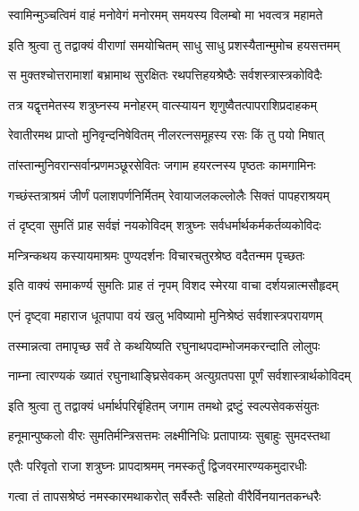 \twolineshloka
{स्वामिन्मुञ्चत्विमं वाहं मनोवेगं मनोरमम्}
{समयस्य विलम्बो मा भवत्वत्र महामते}%


\twolineshloka
{इति श्रुत्वा तु तद्वाक्यं वीराणां समयोचितम्}
{साधु साधु प्रशस्यैतान्मुमोच हयसत्तमम्}%

\twolineshloka
{स मुक्तश्चोत्तरामाशां बभ्रामाथ सुरक्षितः}
{रथपत्तिहयश्रेष्ठैः सर्वशस्त्रास्त्रकोविदैः}%

\twolineshloka
{तत्र यद्वृत्तमेतस्य शत्रुघ्नस्य मनोहरम्}
{वात्स्यायन शृणुष्वैतत्पापराशिप्रदाहकम्}%

\twolineshloka
{रेवातीरमथ प्राप्तो मुनिवृन्दनिषेवितम्}
{नीलरत्नसमूहस्य रसः किं तु पयो मिषात्}%

\twolineshloka
{तांस्तान्मुनिवरान्सर्वान्प्रणमञ्छूरसेवितः}
{जगाम हयरत्नस्य पृष्ठतः कामगामिनः}%

\twolineshloka
{गच्छंस्तत्राश्रमं जीर्णं पलाशपर्णनिर्मितम्}
{रेवायाजलकल्लोलैः सिक्तं पापहराश्रयम्}%

\twolineshloka
{तं दृष्ट्वा सुमतिं प्राह सर्वज्ञं नयकोविदम्}
{शत्रुघ्नः सर्वधर्मार्थकर्मकर्तव्यकोविदः}%


\twolineshloka
{मन्त्रिन्कथय कस्यायमाश्रमः पुण्यदर्शनः}
{विचारचतुरश्रेष्ठ वदैतन्मम पृच्छतः}%


\twolineshloka
{इति वाक्यं समाकर्ण्य सुमतिः प्राह तं नृपम्}
{विशद स्मेरया वाचा दर्शयन्नात्मसौहृदम्}%


\twolineshloka
{एनं दृष्ट्वा महाराज धूतपापा वयं खलु}
{भविष्यामो मुनिश्रेष्ठं सर्वशास्त्रपरायणम्}%

\twolineshloka
{तस्मान्नत्वा तमापृच्छ सर्वं ते कथयिष्यति}
{रघुनाथपदाम्भोजमकरन्दाति लोलुपः}%

\twolineshloka
{नाम्ना त्वारण्यकं ख्यातं रघुनाथाङ्घ्रिसेवकम्}
{अत्युग्रतपसा पूर्णं सर्वशास्त्रार्थकोविदम्}%

\twolineshloka
{इति श्रुत्वा तु तद्वाक्यं धर्मार्थपरिबृंहितम्}
{जगाम तमथो द्रष्टुं स्वल्पसेवकसंयुतः}%

\twolineshloka
{हनूमान्पुष्कलो वीरः सुमतिर्मन्त्रिसत्तमः}
{लक्ष्मीनिधिः प्रतापाग्र्यः सुबाहुः सुमदस्तथा}%

\twolineshloka
{एतैः परिवृतो राजा शत्रुघ्नः प्रापदाश्रमम्}
{नमस्कर्तुं द्विजवरमारण्यकमुदारधीः}%

\twolineshloka
{गत्वा तं तापसश्रेष्ठं नमस्कारमथाकरोत्}
{सर्वैस्तैः सहितो वीरैर्विनयानतकन्धरैः}%

